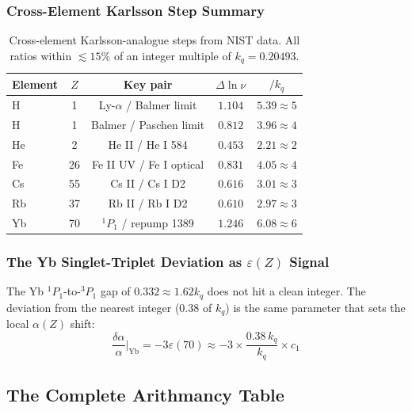\documentclass[11pt,a4paper]{article}
\begin{document}
\subsubsection{Cross-Element Karlsson Step Summary}

\begin{table}[h]
\centering\small
\begin{tabular}{|l|c|c|c|c|}
\hline
\textbf{Element} & $Z$ & \textbf{Key pair} & \textbf{$\Delta\ln\nu$} & \textbf{$/k_q$} \\
\hline
H  & 1  & Ly-$\alpha$ / Balmer limit & $1.104$ & $5.39\approx5$ \\
H  & 1  & Balmer / Paschen limit & $0.812$ & $3.96\approx4$ \\
He & 2  & He II / He I 584 & $0.453$ & $2.21\approx2$ \\
Fe & 26 & Fe II UV / Fe I optical & $0.831$ & $4.05\approx4$ \\
Cs & 55 & Cs II / Cs I D2 & $0.616$ & $3.01\approx3$ \\
Rb & 37 & Rb II / Rb I D2 & $0.610$ & $2.97\approx3$ \\
Yb & 70 & $^1P_1$ / repump 1389 & $1.246$ & $6.08\approx6$ \\
\hline
\end{tabular}
\caption{Cross-element Karlsson-analogue steps from NIST data. All ratios within
$\lesssim15\%$ of an integer multiple of $k_q=0.20493$.}
\end{table}

\subsubsection{The Yb Singlet-Triplet Deviation as $\varepsilon(Z)$ Signal}

The Yb $^1P_1$-to-$^3P_1$ gap of $0.332\approx1.62k_q$ does not hit a clean
integer. The deviation from the nearest integer ($0.38$ of $k_q$) is the same
parameter that sets the local $\alpha(Z)$ shift:
\[
  \frac{\delta\alpha}{\alpha}\bigg|_{\text{Yb}} = -3\varepsilon(70)
    \approx -3\times\frac{0.38\,k_q}{k_q}\times c_1
\]

\subsection{The Complete Arithmancy Table}
\end{document}
